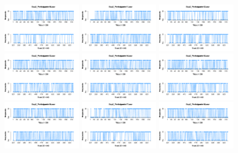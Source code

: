 \begin{figure}[th]
\includegraphics[width=0.30\textwidth]{Figures/Response_Exp2_P10} \includegraphics[width=0.30\textwidth]{Figures/Response_Exp2_P11} \includegraphics[width=0.30\textwidth]{Figures/Response_Exp2_P12}
\includegraphics[width=0.30\textwidth]{Figures/Response_Exp2_P13} \includegraphics[width=0.30\textwidth]{Figures/Response_Exp2_P14} \includegraphics[width=0.30\textwidth]{Figures/Response_Exp2_P15}
\includegraphics[width=0.30\textwidth]{Figures/Response_Exp2_P16} \includegraphics[width=0.30\textwidth]{Figures/Response_Exp2_P17} \includegraphics[width=0.30\textwidth]{Figures/Response_Exp2_P18}

\end{figure}
